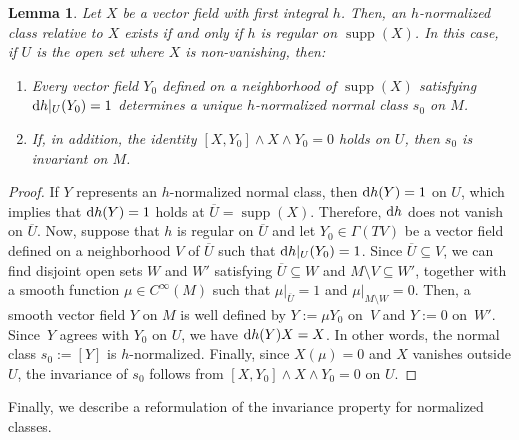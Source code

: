 \documentclass[10pt,a4paper]{amsart}
\newcommand{\dd}{{\rm d}}
\numberwithin{equation}{section}
\newtheorem{Lemma}[Theorem]{Lemma}
\begin{document}
\begin{Lemma}\label{lemma:NormalGood}
Let $X$ be a vector field with first integral $h$. Then, an $h$-normalized class relative to $X$ exists if and only if $h$ is regular on $\operatorname{supp}(X)$. In this case, if $U$ is the open set where $X$ is non-vanishing, then:
 \begin{enumerate}\itemsep=0pt
 \item[$1.$] Every vector field $Y_0$ defined on a neighborhood of $\operatorname{supp}(X)$ satisfying $\dd h|_{U}(Y_0) = 1$ determines a unique $h$-normalized normal class $s_{0}$ on $M$.
 \item[$2.$] If, in addition, the identity $[X,Y_0] \wedge X \wedge Y_0 = 0$ holds on $U$, then $s_{0}$ is invariant on $M$.
 \end{enumerate}
\end{Lemma}
\begin{proof}
If $Y$ represents an $h$-normalized normal class, then $\dd h(Y) = 1$ on $U$, which implies that $\dd h(Y) = 1$ holds at $\overline{U} = \operatorname{supp}(X)$. Therefore, $\dd h$ does not vanish on $\overline{U}$. Now, suppose that $h$ is regular on $\overline{U}$ and let $Y_0 \in \Gamma(TV)$ be a vector field defined on a neighborhood $V$ of $\overline{U}$ such that $\dd h|_{U}(Y_0) = 1$. Since $\overline{U} \subseteq V$, we can find disjoint open sets $W$ and $W'$ satisfying $\overline{U} \subseteq W$ and $M \setminus V \subseteq W'$, together with a smooth function $\mu \in C^{\infty}(M)$ such that $\mu|_{\overline{U}} = 1$ and $\mu|_{M \setminus W} = 0$. Then, a smooth vector field $Y$ on $M$ is well defined by $Y := \mu Y_0$ on~$V$ and $Y := 0$ on~$W'$. Since~$Y$ agrees with $Y_0$ on $U$, we have $\dd h(Y)X = X$. In other words, the normal class $s_0:=[Y]$ is $h$-normalized.
Finally, since $X(\mu) = 0$ and $X$ vanishes outside $U$, the invariance of $s_0$ follows from $[X,Y_0] \wedge X \wedge Y_0 = 0$ on $U$.
\end{proof}

Finally, we describe a reformulation of the invariance property for normalized classes.
\end{document}
